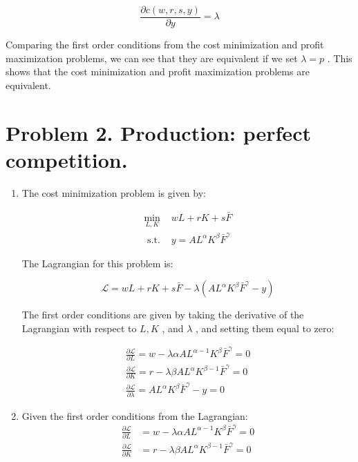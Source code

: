 \documentclass[UTF8,titlepage]{article}
\numberwithin{figure}{section}
\begin{document}
\begin{enumerate}
    \[\frac{\partial c(w, r, s, y)}{\partial y}=\lambda \]
    
    Comparing the first order conditions from the cost minimization and profit maximization problems, we can see that they are equivalent if we set  $\lambda=p$ . This shows that the cost minimization and profit maximization problems are equivalent.
                   
\end{enumerate}

\clearpage

\section{Problem 2. Production: perfect competition.}

\begin{enumerate}
    \item The cost minimization problem is given by:

    \begin{align*}
        \min _{L, K} & w L+r K+s \bar{F} \\
        \text { s.t. } & y=A L^{\alpha} K^{\beta} \bar{F}^{\gamma}
    \end{align*}
    
    The Lagrangian for this problem is:
    
    \[\mathcal{L}=w L+r K+s \bar{F}-\lambda\left(A L^{\alpha} K^{\beta} \bar{F}^{\gamma}-y\right)\]
    
    The first order conditions are given by taking the derivative of the Lagrangian with respect to  $L, K$ , and  $\lambda$ , and setting them equal to zero:
    
    \begin{align*}
        \frac{\partial \mathcal{L}}{\partial L}=w-\lambda \alpha A L^{\alpha-1} K^{\beta} \bar{F}^{\gamma}=0 \\
        \frac{\partial \mathcal{L}}{\partial K}=r-\lambda \beta A L^{\alpha} K^{\beta-1} \bar{F}^{\gamma}=0 \\
        \frac{\partial \mathcal{L}}{\partial \lambda}=A L^{\alpha} K^{\beta} \bar{F}^{\gamma}-y=0
    \end{align*}
    
    \item Given the first order conditions from the Lagrangian:
    \begin{align*}
    \frac{\partial \mathcal{L}}{\partial L} &= w-\lambda \alpha A L^{\alpha-1} K^{\beta} \bar{F}^{\gamma}=0 \\
    \frac{\partial \mathcal{L}}{\partial K} &= r-\lambda \beta A L^{\alpha} K^{\beta-1} \bar{F}^{\gamma}=0
    \end{align*}
    

\end{enumerate}
\end{document}

